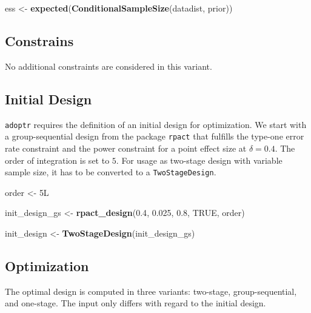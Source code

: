 \documentclass[]{book}
\newenvironment{Shaded}{\begin{snugshade}}{\end{snugshade}}
\newcommand{\FloatTok}[1]{\textcolor[rgb]{0.00,0.00,0.81}{#1}}
\newcommand{\KeywordTok}[1]{\textcolor[rgb]{0.13,0.29,0.53}{\textbf{#1}}}
\newcommand{\NormalTok}[1]{#1}
\newcommand{\OtherTok}[1]{\textcolor[rgb]{0.56,0.35,0.01}{#1}}
\newcommand{\StringTok}[1]{\textcolor[rgb]{0.31,0.60,0.02}{#1}}
\begin{document}
\begin{Shaded}
\begin{Highlighting}[]
\NormalTok{ess <-}\StringTok{ }\KeywordTok{expected}\NormalTok{(}\KeywordTok{ConditionalSampleSize}\NormalTok{(datadist, prior))}
\end{Highlighting}
\end{Shaded}

\hypertarget{constrains-3}{%
\subsection{Constrains}\label{constrains-3}}

No additional constraints are considered in this variant.

\hypertarget{initial-design-3}{%
\subsection{Initial Design}\label{initial-design-3}}

\texttt{adoptr} requires the definition of an initial design for optimization.
We start with a group-sequential design from the package \texttt{rpact} that
fulfills the type-one error rate constraint and the power
constraint for a point effect size at \(\delta = 0.4\).
The order of integration is set to \(5\).
For usage as two-stage design with variable sample size, it has to
be converted to a \texttt{TwoStageDesign}.

\begin{Shaded}
\begin{Highlighting}[]
\NormalTok{order <-}\StringTok{ }\NormalTok{5L }

\NormalTok{init_design_gs <-}\StringTok{ }\KeywordTok{rpact_design}\NormalTok{(}\FloatTok{0.4}\NormalTok{, }\FloatTok{0.025}\NormalTok{, }\FloatTok{0.8}\NormalTok{, }\OtherTok{TRUE}\NormalTok{, order)}

\NormalTok{init_design    <-}\StringTok{ }\KeywordTok{TwoStageDesign}\NormalTok{(init_design_gs)}
\end{Highlighting}
\end{Shaded}

\hypertarget{optimization-3}{%
\subsection{Optimization}\label{optimization-3}}

The optimal design is computed in three variants: two-stage,
group-sequential, and one-stage.
The input only differs with regard to the initial design.
\end{document}
